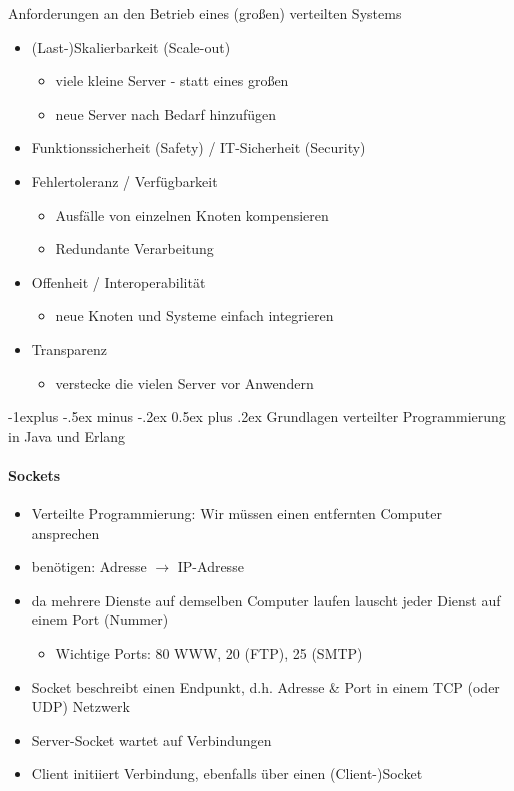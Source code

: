 \documentclass[10pt]{article}
\makeatletter
\renewcommand{\subsection}{\@startsection{subsection}{2}{0mm}%
                                {-1explus -.5ex minus -.2ex}%
                                {0.5ex plus .2ex}%
                                {\normalfont\normalsize\bfseries}}
\makeatother
\begin{document}
Anforderungen an den Betrieb eines (großen) verteilten Systems
\begin{itemize}
  \item (Last-)Skalierbarkeit (Scale-out)
        \begin{itemize}
          \item viele kleine Server - statt eines großen
          \item neue Server nach Bedarf hinzufügen
        \end{itemize}
  \item Funktionssicherheit (Safety) / IT-Sicherheit (Security)
  \item Fehlertoleranz / Verfügbarkeit
        \begin{itemize}
          \item Ausfälle von einzelnen Knoten kompensieren
          \item Redundante Verarbeitung
        \end{itemize}
  \item Offenheit / Interoperabilität
        \begin{itemize}
          \item neue Knoten und Systeme einfach integrieren
        \end{itemize}
  \item Transparenz
        \begin{itemize}
          \item verstecke die vielen Server vor Anwendern
        \end{itemize}
\end{itemize}


\subsection{Grundlagen verteilter Programmierung in Java und Erlang}
\paragraph{Sockets}
\begin{itemize}
  \item Verteilte Programmierung: Wir müssen einen entfernten Computer ansprechen
  \item benötigen: Adresse $\rightarrow$ IP-Adresse
  \item da mehrere Dienste auf demselben Computer laufen lauscht jeder Dienst auf einem Port (Nummer)
        \begin{itemize}
          \item Wichtige Ports: 80 WWW, 20 (FTP), 25 (SMTP)
        \end{itemize}
  \item Socket beschreibt einen Endpunkt, d.h. Adresse \& Port in einem TCP (oder UDP) Netzwerk
  \item Server-Socket wartet auf Verbindungen
  \item Client initiiert Verbindung, ebenfalls über einen (Client-)Socket
\end{itemize}
\end{document}
